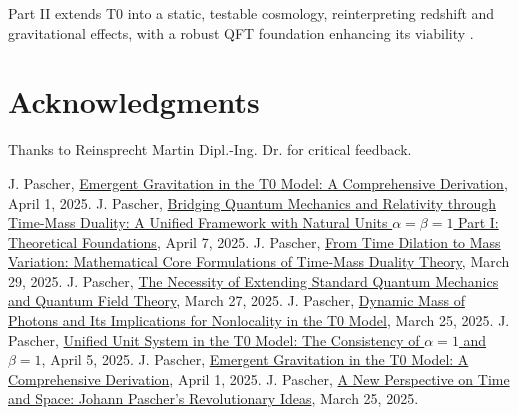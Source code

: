 \documentclass[12pt,a4paper]{article}
\newenvironment{acknowledgments}
{\section*{Acknowledgments}}
{\vspace{1em}}
\begin{document}
	Part II extends T0 into a static, testable cosmology, reinterpreting redshift and gravitational effects, with a robust QFT foundation enhancing its viability \cite{pascher_perspective_2025}.
	
	\begin{acknowledgments}
		Thanks to Reinsprecht Martin Dipl.-Ing. Dr. for critical feedback.
	\end{acknowledgments}
		
	
	\begin{thebibliography}{99}
		 J. Pascher, \href{https://github.com/jpascher/T0-Time-Mass-Duality/tree/main/2/pdf/English/EmergentGravT0En.pdf}{Emergent Gravitation in the T0 Model: A Comprehensive Derivation}, April 1, 2025.
		 J. Pascher, \href{https://github.com/jpascher/T0-Time-Mass-Duality/tree/main/2/pdf/English/QMRelTimeMassPart1En.pdf}{Bridging Quantum Mechanics and Relativity through Time-Mass Duality: A Unified Framework with Natural Units \(\alpha = \beta = 1\) Part I: Theoretical Foundations}, April 7, 2025.
		 J. Pascher, \href{https://github.com/jpascher/T0-Time-Mass-Duality/tree/main/2/pdf/English/MathZeitMasseLagrange.pdf}{From Time Dilation to Mass Variation: Mathematical Core Formulations of Time-Mass Duality Theory}, March 29, 2025.
		 J. Pascher, \href{https://github.com/jpascher/T0-Time-Mass-Duality/tree/main/2/pdf/English/NotwendigkeitQMErweiterungEn.pdf}{The Necessity of Extending Standard Quantum Mechanics and Quantum Field Theory}, March 27, 2025.
		 J. Pascher, \href{https://github.com/jpascher/T0-Time-Mass-Duality/tree/main/2/pdf/English/DynMassePhotonenNichtlokalEn.pdf}{Dynamic Mass of Photons and Its Implications for Nonlocality in the T0 Model}, March 25, 2025.
		 J. Pascher, \href{https://github.com/jpascher/T0-Time-Mass-Duality/tree/main/2/pdf/English/Alpha1Beta1KonsistenzEn.pdf}{Unified Unit System in the T0 Model: The Consistency of \(\alpha = 1\) and \(\beta = 1\)}, April 5, 2025.
		 J. Pascher, \href{https://github.com/jpascher/T0-Time-Mass-Duality/tree/main/2/pdf/English/EmergentGravT0En.pdf}{Emergent Gravitation in the T0 Model: A Comprehensive Derivation}, April 1, 2025.
		 J. Pascher, \href{https://github.com/jpascher/T0-Time-Mass-Duality/tree/main/2/pdf/English/ZeitRaumPascherEn.pdf}{A New Perspective on Time and Space: Johann Pascher’s Revolutionary Ideas}, March 25, 2025.

\end{thebibliography}
\end{document}

